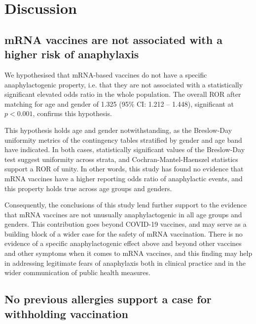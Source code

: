 \documentclass{article}
\begin{document}
\section{Discussion}

\subsection{mRNA vaccines are not associated with a higher risk of anaphylaxis}

We hypothesised that mRNA-based vaccines do not have a specific anaphylactogenic property, i.e. that they are not associated with a statistically significant elevated odds ratio in the whole population.
The overall ROR after matching for age and gender of 1.325 (95\% CI: 1.212 -- 1.448), significant at $p<0.001$, confirms this hypothesis.

This hypothesis holds age and gender notwithstanding, as the Breslow-Day uniformity metrics of the contingency tables stratified by gender and age band have indicated.
In both cases, statistically significant values of the Breslow-Day test suggest uniformity across strata, and Cochran-Mantel-Haenszel statistics support a ROR of unity.
In other words, this study has found no evidence that mRNA vaccines have a higher reporting odds ratio of anaphylactic events, and this property holds true across age groups and genders.

Consequently, the conclusions of this study lend further support to the evidence that mRNA vaccines are not unusually anaphylactogenic in all age groups and genders.
This contribution goes beyond COVID-19 vaccines, and may serve as a building block of a wider case for the safety of mRNA vaccination.
There is no evidence of a specific anaphylactogenic effect above and beyond other vaccines and other symptoms when it comes to mRNA vaccines, and this finding may help in addressing legitimate fears of anaphylaxis both in clinical practice and in the wider communication of public health measures.


\subsection{No previous allergies support a case for withholding vaccination}
\end{document}
